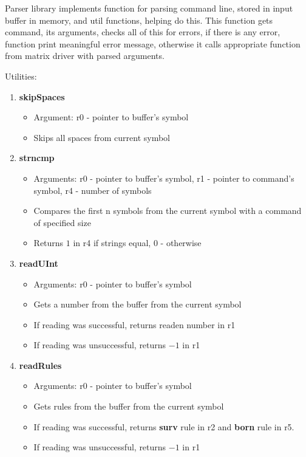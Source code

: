 Parser library implements function for parsing command line, stored in input buffer in memory, and util functions, helping do this. This function gets command, its arguments, checks all of this for errors, if there is any error, function print meaningful error message, otherwise it calls appropriate function from matrix driver with parsed arguments.

Utilities:

\begin{enumerate}
	\item \textbf{skipSpaces}
		\begin{itemize}
			\item Argument: r0 - pointer to buffer's symbol
			\item Skips all spaces from current symbol
		\end{itemize}
	\item \textbf{strncmp}
		\begin{itemize}
			\item Arguments: r0 - pointer to buffer's symbol, r1 - pointer to command's symbol, r4 - number of symbols
			\item Compares the first n symbols from the current symbol with a command of specified size
			\item Returns $1$ in r4 if strings equal, $0$ - otherwise
		\end{itemize}
	\item \textbf{readUInt}
		\begin{itemize}
			\item Arguments: r0 - pointer to buffer's symbol
			\item Gets a number from the buffer from the current symbol
			\item If reading was successful, returns readen number in r1
			\item If reading was unsuccessful, returns $-1$ in r1
		\end{itemize}
	\item \textbf{readRules}
		\begin{itemize}
			\item Arguments: r0 - pointer to buffer's symbol
			\item Gets rules from the buffer from the current symbol
			\item If reading was successful, returns \textbf{surv} rule in r2 and \textbf{born} rule in r5.
			\item If reading was unsuccessful, returns $-1$ in r1
		\end{itemize}
\end{enumerate}

